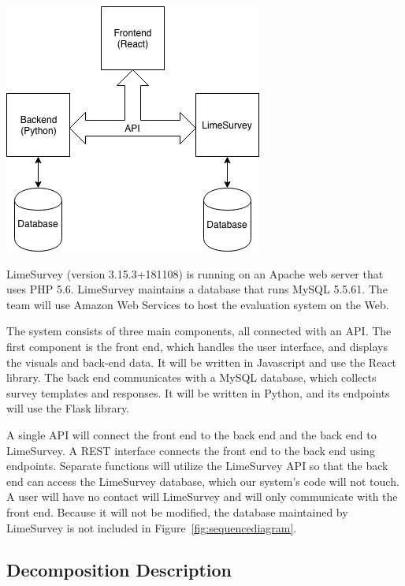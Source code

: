 \documentclass{article}
\begin{document}
\begin{center}
\label{fig:componentdiagram}
{\includegraphics[scale=.7]{images/component_diagram.png}} 
\end{center}

\vspace{3mm}

LimeSurvey (version 3.15.3+181108) is running on an Apache web server that uses PHP 5.6. LimeSurvey maintains a database that runs MySQL 5.5.61. The team will use Amazon Web Services to host the evaluation system on the Web.

The system consists of three main components, all connected with an API. The first component is the front end, which handles the user interface, and displays the visuals and back-end data. It will be written in Javascript and use the React library. The back end communicates with a MySQL database, which collects survey templates and responses. It will be written in Python, and its endpoints will use the Flask library.

A single API will connect the front end to the back end and the back end to LimeSurvey. A REST interface connects the front end to the back end using endpoints. Separate functions will utilize the LimeSurvey API so that the back end can access the LimeSurvey database, which our system's code will not touch. A user will have no contact will LimeSurvey and will only communicate with the front end. Because it will not be modified, the database maintained by LimeSurvey is not included in Figure~\ref{fig:sequencediagram}. 

\subsection{Decomposition Description}
\end{document}
